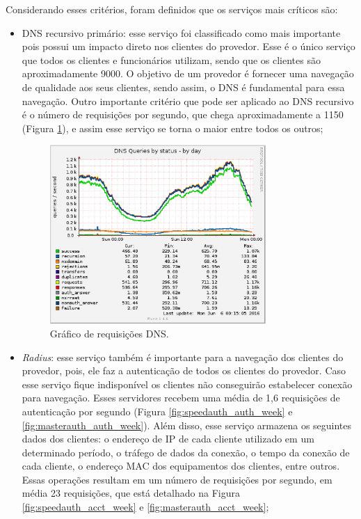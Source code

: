 Considerando esses critérios, foram definidos que os serviços mais críticos são:
\begin{itemize}
 \item \ac{DNS} recursivo primário: esse serviço foi classificado como mais importante pois possui um impacto direto nos clientes do provedor. 
 Esse é o único serviço que todos os clientes e funcionários utilizam, sendo que os clientes são aproximadamente 9000. O objetivo de um provedor 
 é fornecer uma navegação de qualidade aos seus clientes, sendo assim, o \ac{DNS} é fundamental para essa navegação. Outro importante critério
 que pode ser aplicado ao \ac{DNS} recursivo é o número de requisições por segundo, que chega aproximadamente a 1150 (Figura \ref{fig:passata_day}),
 e assim esse serviço se torna o maior entre todos os outros;
 
\begin{figure}[h!]
 \centering
 \includegraphics[width=310px]{img/passata_day.eps}
 \caption{Gráfico de requisições DNS.}
 \label{fig:passata_day}
\end{figure}

 \item \textit{Radius}: esse serviço também é importante para a navegação dos clientes do provedor, pois, ele faz a autenticação de todos os 
 clientes do provedor. Caso esse serviço fique indisponível os clientes não conseguirão estabelecer conexão para navegação. Esses servidores 
 recebem uma média de 1,6 requisições de autenticação por segundo (Figura \ref{fig:speedauth_auth_week} e \ref{fig:masterauth_auth_week}). 
 Além disso, esse serviço armazena os seguintes dados dos clientes: o endereço de \ac{IP} de cada cliente utilizado em um determinado período, 
 o tráfego de dados da conexão, o tempo da conexão de cada cliente, o endereço \ac{MAC} dos equipamentos dos clientes, entre outros. 
 Essas operações resultam em um número de requisições por segundo, em média 23 requisições, que está detalhado na 
 Figura \ref{fig:speedauth_acct_week} e \ref{fig:masterauth_acct_week};
 

\end{itemize}
